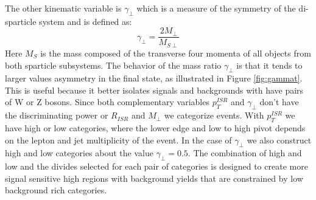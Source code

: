 
 The other kinematic variable is $\gamma_\perp$ which is a measure of the symmetry of the di-sparticle system and is defined as:
\begin{equation}
\gamma_\perp = \frac{2M_\perp}{M_{S\perp}}
\end{equation}
Here $M_S$ is the mass composed of the transverse four momenta of all objects from  both sparticle subsystems. The behavior of the mass ratio $\gamma_\perp$ is that it tends to larger values asymmetry in the final state, as illustrated in Figure \ref{fig:gammat}. This is useful because it better isolates signals and backgrounds with have pairs of W or Z bosons. Since both complementary variables $p_T^{ISR}$ and $\gamma_\perp$ don't have the discriminating power or $R_{ISR}$ and $M_\perp$ we categorize events. With $p_T^{ISR}$ we have high or low categories, where the lower edge and low to high pivot depends on the lepton and jet multiplicity of the event. In the case of $\gamma_\perp$ we also construct high and low categories about the value $\gamma_\perp= 0.5$. The combination of high and low and the divides selected for each pair of categories is designed to create more signal sensitive high regions with background yields that are constrained by low background rich categories.

  


